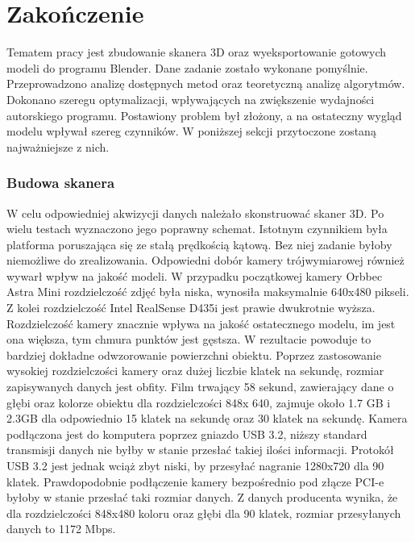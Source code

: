 \chapter{Zako{\'n}czenie}

Tematem pracy jest zbudowanie skanera 3D oraz wyeksportowanie gotowych modeli do programu Blender. Dane zadanie zostało wykonane pomyślnie. Przeprowadzono analizę dostępnych metod oraz teoretyczną analizę algorytmów. Dokonano szeregu optymalizacji, wpływających na zwiększenie wydajności autorskiego programu. Postawiony problem był złożony, a na ostateczny wygląd modelu wpływał szereg czynników. W poniższej sekcji przytoczone zostaną najważniejsze z nich.
\subsection{Budowa skanera}
W celu odpowiedniej akwizycji danych należało skonstruować skaner 3D. Po wielu testach wyznaczono jego poprawny schemat. Istotnym czynnikiem była platforma poruszająca się ze stałą prędkością kątową. Bez niej zadanie byłoby niemożliwe do zrealizowania. Odpowiedni dobór kamery trójwymiarowej również wywarł wpływ na jakość modeli. W przypadku początkowej kamery Orbbec Astra Mini rozdzielczość zdjęć była niska, wynosiła maksymalnie 640x480 pikseli. Z kolei rozdzielczość Intel RealSense D435i jest prawie dwukrotnie wyższa. Rozdzielczość kamery znacznie wpływa na jakość ostatecznego modelu, im jest ona większa, tym chmura punktów jest gęstsza. W rezultacie powoduje to bardziej dokładne odwzorowanie powierzchni obiektu. Poprzez zastosowanie wysokiej rozdzielczości kamery oraz dużej liczbie klatek na sekundę, rozmiar zapisywanych danych jest obfity. Film trwający 58 sekund, zawierający dane o głębi oraz kolorze obiektu dla rozdzielczości 848x 640, zajmuje około 1.7 GB i 2.3GB dla odpowiednio 15 klatek na sekundę oraz 30 klatek na sekundę. Kamera podłączona jest do komputera poprzez gniazdo USB 3.2, niższy standard transmisji danych nie byłby w stanie przesłać takiej ilości informacji. Protokół USB 3.2 jest jednak wciąż zbyt niski, by przesyłać nagranie 1280x720 dla 90 klatek. Prawdopodobnie podłączenie kamery bezpośrednio pod złącze PCI-e byłoby w stanie przesłać taki rozmiar danych. Z danych producenta wynika, że dla rozdzielczości 848x480 koloru oraz głębi dla 90 klatek, rozmiar przesyłanych danych to 1172 Mbps.

